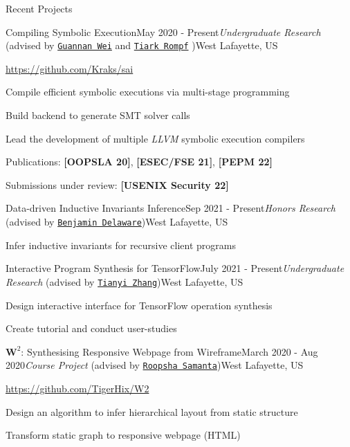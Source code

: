 \documentclass{resume} %
\begin{document}
\begin{rSection}{Recent Projects}

\begin{rSubsection}{Compiling Symbolic Execution}{May 2020 - Present}{\textit{Undergraduate Research} (advised by \href{http://continuation.passing.style/}{\texttt{Guannan Wei}} and \href{http://tiarkrompf.github.io/}{\texttt{Tiark Rompf}} )}{West Lafayette, US}
\item \url{https://github.com/Kraks/sai}
\item Compile efficient symbolic executions via multi-stage programming
\item Build backend to generate SMT solver calls
\item Lead the development of multiple \textit{LLVM} symbolic execution compilers
\item Publications: \textbf{[OOPSLA 20]}, \textbf{[ESEC/FSE 21]}, \textbf{[PEPM 22]}
\item Submissions under review: \textbf{[USENIX Security 22]}
\end{rSubsection}

\begin{rSubsection}{Data-driven Inductive Invariants Inference}{Sep 2021 - Present}{\textit{Honors Research} (advised by \href{https://www.cs.purdue.edu/homes/bendy/}{\texttt{Benjamin Delaware}})}{West Lafayette, US}
    \item Infer inductive invariants for recursive client programs
\end{rSubsection}

\begin{rSubsection}{Interactive Program Synthesis for TensorFlow}{July 2021 - Present}{\textit{Undergraduate Research} (advised by \href{https://tianyi-zhang.github.io/}{\texttt{Tianyi Zhang}})}{West Lafayette, US}
    \item Design interactive interface for TensorFlow operation synthesis
    \item Create tutorial and conduct user-studies
\end{rSubsection}

\begin{rSubsection}{$\mathbf{W}^2$: Synthesising Responsive Webpage from Wireframe}{March 2020 - Aug 2020}{\textit{Course Project} (advised by \href{https://www.cs.purdue.edu/homes/roopsha/}{\texttt{Roopsha Samanta}})}{West Lafayette, US}
\item \url{https://github.com/TigerHix/W2}
\item Design an algorithm to infer hierarchical layout from static structure
\item Transform static graph to responsive webpage (HTML)
\end{rSubsection}


\end{rSection}
\end{document}
